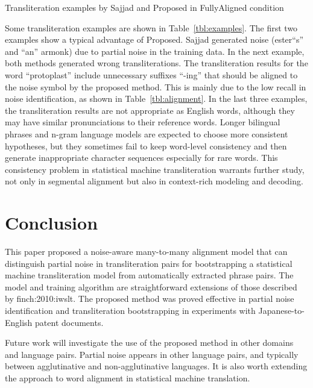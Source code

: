 \documentclass[english]{jnlp_1.4}
\newcommand{\newcite}{}
\begin{document}
\begin{table}[b]
\caption{Transliteration examples by {\sc Sajjad} and {\sc Proposed} in {\sc FullyAligned} condition}
\label{tbl:examples}

\end{table}

Some transliteration examples are shown in Table~{\ref{tbl:examples}}.
The first two examples show a typical advantage of {\sc Proposed}.
{\sc Sajjad} generated noise (ester``s'' and ``an'' armonk) due to partial noise in the training data.
In the next example, both methods generated wrong transliterations.
The transliteration results for the word ``protoplast'' include unnecessary suffixes ``-ing''
that should be aligned to the noise symbol by the proposed method.
This is mainly due to the low recall in noise identification, as shown in Table~{\ref{tbl:alignment}}.
In the last three examples, the transliteration results are not appropriate as English words,
although they may have similar pronunciations to their reference words.
Longer bilingual phrases and n-gram language models are expected to choose more consistent hypotheses,
but they sometimes fail to keep word-level consistency
and then generate inappropriate character sequences especially for rare words.
This consistency problem in statistical machine transliteration warrants
further study,
not only in segmental alignment but also in context-rich modeling and decoding.


\section{Conclusion}

This paper proposed a noise-aware many-to-many alignment model that can distinguish partial noise in transliteration pairs
for bootstrapping a statistical machine transliteration model from automatically extracted phrase pairs.
The model and training algorithm are straightforward extensions of those described by \newcite{finch:2010:iwslt}.
The proposed method was proved effective in partial noise identification and transliteration bootstrapping
in experiments with Japanese-to-English patent documents.

Future work will investigate the use of the proposed method in other domains and language pairs.
Partial noise appears in other language pairs, and typically between agglutinative and non-agglutinative languages.
It is also worth extending the approach to word alignment in statistical machine translation.
\end{document}
